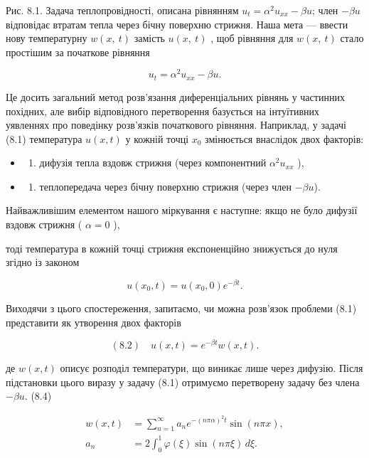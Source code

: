 \documentclass[
  ukrainian,
]{article}
\providecommand{\tightlist}{%
  \setlength{\itemsep}{0pt}\setlength{\parskip}{0pt}}
\begin{document}
Рис. 8.1. Задача теплопровідності, описана рівнянням
\(u_t=\alpha^2u_{xx}-\beta u\); член \(-\beta u\) відповідає втратам
тепла через бічну поверхню стрижня. Наша мета --- ввести нову
температурну \(w\left(x,\ t\right)\) замість \(u\left(x,\ t\right)\) ,
щоб рівняння для \(w\left(x,\ t\right)\) стало простішим за початкове
рівняння

\[
u_t = \alpha^2 u_{xx} - \beta u.
\]

Це досить загальний метод розв'язання диференціальних рівнянь у
частинних похідних, але вибір відповідного перетворення базується на
інтуїтивних уявленнях про поведінку розв'язків початкового рівняння.
Наприклад, у задачі (8.1) температура \(u(x, t)\) у кожній точці \(x_0\)
змінюється внаслідок двох факторів:

\begin{itemize}
\tightlist
\item
  \begin{enumerate}
  \def\labelenumi{\arabic{enumi})}
  \tightlist
  \item
    дифузія тепла вздовж стрижня (через компонентний \(\alpha^2 u_{xx}\)
    ),
  \end{enumerate}
\item
  \begin{enumerate}
  \def\labelenumi{\arabic{enumi})}
  \setcounter{enumi}{1}
  \tightlist
  \item
    теплопередача через бічну поверхню стрижня (через член
    \(-\beta u\)).
  \end{enumerate}
\end{itemize}

Найважливішим елементом нашого міркування є наступне: якщо не було
дифузії вздовж стрижня ( \(\alpha = 0\) ),

тоді температура в кожній точці стрижня експоненційно знижується до нуля
згідно із законом

\[
u(x_0,t)=u(x_0,0)e^{-\beta t}.
\]

Виходячи з цього спостереження, запитаємо, чи можна розв'язок проблеми
(8.1) представити як утворення двох факторів

\[
(8.2)\quad u(x,t)=e^{-\beta t}w(x,t).
\]

де \(w(x,t)\) описує розподіл температури, що виникає лише через
дифузію. Після підстановки цього виразу у задачу (8.1) отримуємо
перетворену задачу без члена \(-\beta u\). (8.4)

\[
\begin{aligned}
w(x,t)&=\sum_{n=1}^{\infty} a_n e^{-(n\pi\alpha)^2 t}\sin(n\pi x),\\
a_n&=2\int_0^1 \varphi(\xi)\sin(n\pi \xi)\,d\xi.
\end{aligned}
\]
\end{document}
